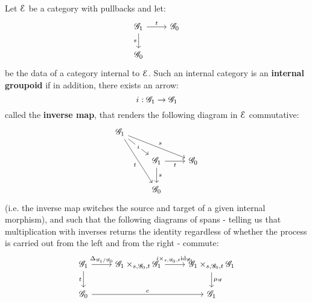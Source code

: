             \begin{definition} \label{def: internal_groupoids}
                Let $\mathcal{E}$ be a category with pullbacks and let:
                    $$
                        \begin{tikzcd}
                        	{\scrG_1} & {\scrG_0} \\
                        	{\scrG_0}
                        	\arrow["s"', from=1-1, to=2-1]
                        	\arrow["t", from=1-1, to=1-2]
                        \end{tikzcd}
                    $$
                be the data of a category internal to $\mathcal{E}$. Such an internal category is an \textbf{internal groupoid} if in addition, there exists an arrow:
                    $$i: \mathscr{G}_1 \to \mathscr{G}_1$$
                called the \textbf{inverse map}, that renders the following diagram in $\mathcal{E}$ commutative:
                    $$
                        \begin{tikzcd}
                        	{\scrG_1} \\
                        	& {\scrG_1} & {\scrG_0} \\
                        	& {\scrG_0}
                        	\arrow["i"{description}, from=1-1, to=2-2]
                        	\arrow["t"', from=1-1, to=3-2]
                        	\arrow["s", from=2-2, to=3-2]
                        	\arrow["t"', from=2-2, to=2-3]
                        	\arrow["s", from=1-1, to=2-3]
                        \end{tikzcd}
                    $$
                (i.e. the inverse map switches the source and target of a given internal morphism), and such that the following diagrams of spans - telling us that multiplication with inverses returns the identity regardless of whether the process is carried out from the left and from the right - commute:
                    $$
                        \begin{tikzcd}
                        	{\scrG_1} & {\scrG_1 \x_{s, \scrG_0, t} \scrG_1} & {\scrG_1 \x_{s, \scrG_0, t} \scrG_1} \\
                        	{\scrG_0} && {\scrG_1}
                        	\arrow["{\mu_{\scrG}}", from=1-3, to=2-3]
                        	\arrow["{i \x_{s, \scrG_0, t} \id_{\scrG_1}}", from=1-2, to=1-3]
                        	\arrow["{\Delta_{\scrG_1/\scrG_0}}", from=1-1, to=1-2]
                        	\arrow["t"', from=1-1, to=2-1]
                        	\arrow["e", from=2-1, to=2-3]
                        \end{tikzcd}
$$
\end{definition}
